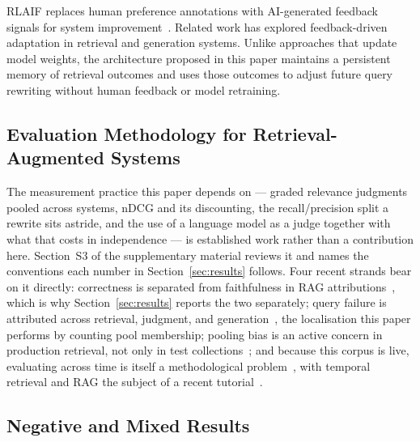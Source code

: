 \documentclass[acmsmall,review,anonymous,screen]{acmart}
\begin{document}
RLAIF replaces human preference annotations with AI-generated feedback
signals for system improvement~\cite{bai2022constitutional}. Related
work has explored feedback-driven adaptation in retrieval and generation
systems. Unlike approaches that update model weights, the architecture
proposed in this paper maintains a persistent memory of retrieval
outcomes and uses those outcomes to adjust future query rewriting
without human feedback or model retraining.

\subsection{Evaluation Methodology for Retrieval-Augmented Systems}

The measurement practice this paper depends on --- graded relevance judgments
pooled across systems, nDCG and its discounting, the recall/precision split a
rewrite sits astride, and the use of a language model as a judge together with
what that costs in independence --- is established work rather than a
contribution here. Section~S3 of the supplementary material reviews it and
names the conventions each number in Section~\ref{sec:results} follows.
Four recent strands bear on it directly: correctness is separated from
faithfulness in RAG attributions~\cite{wallat2025correctness}, which is why
Section~\ref{sec:results} reports the two separately; query failure is
attributed across retrieval, judgment, and
generation~\cite{hosseini2026failing}, the localisation this paper performs by
counting pool membership; pooling bias is an active concern in production
retrieval, not only in test collections~\cite{wang2024poolingbias}; and because
this corpus is live, evaluating across time is itself a methodological
problem~\cite{keller2025continuous}, with temporal retrieval and RAG the subject
of a recent tutorial~\cite{piryani2026temporal}.

\subsection{Negative and Mixed Results}
\end{document}
